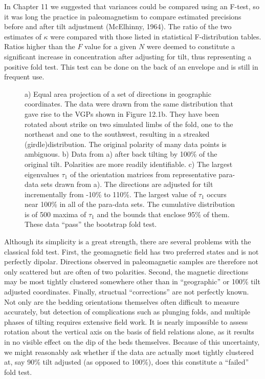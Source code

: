 In Chapter 11 we suggested that variances could be compared using an F-test, so it was long the practice in paleomagnetism to compare estimated precisions  before and after tilt adjustment
 (McElhinny, 1964). \nocite{mcelhinny64}
The ratio of the two estimates of $\kappa$ were 
 compared 
with those listed in statistical
 F-distribution tables. Ratios higher than  the 
$F$ value for a given $N$ were deemed to constitute a significant increase in
concentration after adjusting for tilt,  thus representing
 a positive fold test.  This
test can be done on the back of an envelope and  is still in frequent use.

\begin{figure}[htb]
\epsfxsize 16cm 
\centering {}
\caption{
a) Equal area projection of a set of directions in geographic coordinates.
The data were drawn from the same distribution that gave rise to the VGPs shown in Figure 12.1b.  They have been rotated about strike on two simulated limbs of the fold, one to the northeast and one to the southwest, resulting in  a streaked (girdle)distribution.  The  original polarity of many
data points is ambiguous.  b) Data from a) after back tilting by  100\% of the original tilt.     Polarities
are more readily identifiable.  
c) The largest eigenvalues $\tau_1$ of the orientation matrices
from representative para-data sets drawn from a).  The
directions are adjusted for tilt incrementally from -10\% to 110\%.  The
largest value of $\tau_1$ occurs near 100\% in all of the para-data
sets. The cumulative distribution is of 500 maxima of $\tau_1$ and the bounds that enclose 95\% of them.     These data
``pass'' the bootstrap fold test.}
\label{fig:foldtest}
\end{figure}

Although its simplicity is a great strength, there are several problems with the
classical  fold test.
  First, the  geomagnetic field has two preferred states and is not perfectly dipolar.
Directions observed in paleomagnetic samples are therefore not only
scattered but are often of two polarities.
Second, the magnetic directions may be most tightly clustered somewhere other than in
``geographic'' or 100\% tilt adjusted coordinates.  Finally, structual
``corrections'' are not perfectly known.  Not only are the bedding
orientations themselves often difficult to measure
accurately, but detection of complications such as plunging folds, and
multiple phases of tilting requires
extensive field work.  It is nearly impossible to assess
rotation about the vertical axis on the basis of field relations alone,
as it results in no visible effect on the dip of the beds themselves.
Because of this uncertainty, we might reasonably ask whether if the data are actually
most tightly clustered at, say 90\% tilt adjusted (as opposed to 100\%), does this
constitute a ``failed'' fold test.
 
